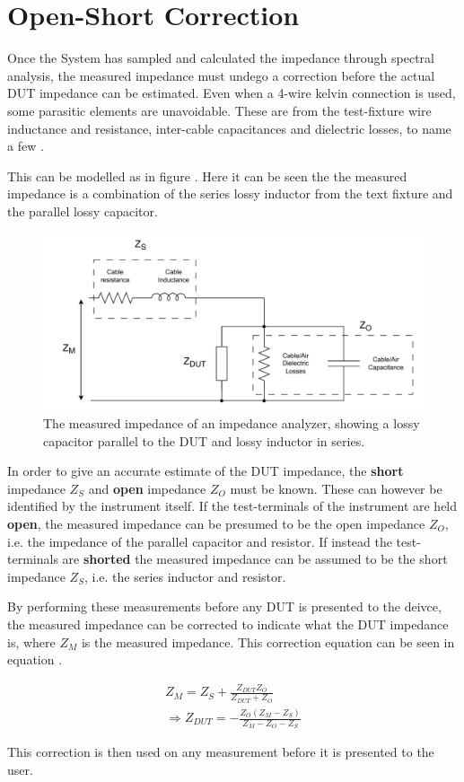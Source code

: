 \section{Open-Short Correction} \label{subsec:OpenShort} 
Once the System has sampled and calculated the impedance through spectral analysis, the measured impedance must undego a correction before the actual DUT impedance can be estimated. Even when a 4-wire kelvin connection is used, some parasitic elements are unavoidable. These are from the test-fixture wire inductance and resistance, inter-cable capacitances and dielectric losses, to name a few \cite{OpenShort}.

This can be modelled as in figure . Here it can be seen the the measured impedance is a combination of the series lossy inductor from the text fixture and the parallel lossy capacitor. 

\begin{figure}[H]
    \centering
    \includegraphics[clip, trim=0 0 0 0, width=1.0\textwidth]{Sections/7_SystemDesign/Figures/OpenShort.pdf}
    \caption{The measured impedance of an impedance analyzer, showing a lossy capacitor parallel to the DUT and lossy inductor in series.}
    \label{fig_7_3_3_5_OpenShort}
\end{figure}

In order to give an accurate estimate of the DUT impedance, the \textbf{short} impedance $Z_S$ and \textbf{open} impedance $Z_O$ must be known. These can however be identified by the instrument itself. If the test-terminals of the instrument are held \textbf{open}, the measured impedance can be presumed to be the open impedance $Z_O$, i.e. the impedance of the parallel capacitor and resistor. If instead the test-terminals are \textbf{shorted} the measured impedance can be assumed to be the short impedance $Z_S$, i.e. the series inductor and resistor.

By performing these measurements before any DUT is presented to the deivce, the measured impedance can be corrected to indicate what the DUT impedance is, where $Z_M$ is the measured impedance. This correction equation can be seen in equation .

\begin{equation}
\label{eq:OpenShort}
\begin{split}
    Z_M = Z_S + \frac{Z_{DUT}Z_O}{Z_{DUT}+Z_O} \\
    \Rightarrow Z_{DUT} = -\frac{Z_O(Z_M-Z_S)}{Z_M-Z_O-Z_S} 
\end{split}
\end{equation}

This correction is then used on any measurement before it is presented to the user. 